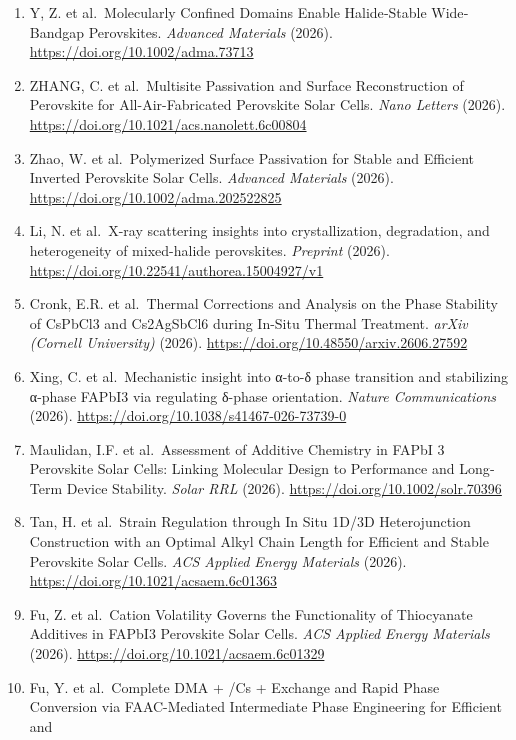 \documentclass[
  11pt,
]{article}
\begin{document}
\begin{enumerate}
  cells. \emph{Materials Futures} (2026).
  \url{https://doi.org/10.1088/2752-5724/ae7817}
\item
  Y, Z. et al.~Molecularly Confined Domains Enable Halide‐Stable
  Wide‐Bandgap Perovskites. \emph{Advanced Materials} (2026).
  \url{https://doi.org/10.1002/adma.73713}
\item
  ZHANG, C. et al.~Multisite Passivation and Surface Reconstruction of
  Perovskite for All-Air-Fabricated Perovskite Solar Cells. \emph{Nano
  Letters} (2026). \url{https://doi.org/10.1021/acs.nanolett.6c00804}
\item
  Zhao, W. et al.~Polymerized Surface Passivation for Stable and
  Efficient Inverted Perovskite Solar Cells. \emph{Advanced Materials}
  (2026). \url{https://doi.org/10.1002/adma.202522825}
\item
  Li, N. et al.~X-ray scattering insights into crystallization,
  degradation, and heterogeneity of mixed-halide perovskites.
  \emph{Preprint} (2026).
  \url{https://doi.org/10.22541/authorea.15004927/v1}
\item
  Cronk, E.R. et al.~Thermal Corrections and Analysis on the Phase
  Stability of CsPbCl3 and Cs2AgSbCl6 during In-Situ Thermal Treatment.
  \emph{arXiv (Cornell University)} (2026).
  \url{https://doi.org/10.48550/arxiv.2606.27592}
\item
  Xing, C. et al.~Mechanistic insight into α-to-δ phase transition and
  stabilizing α-phase FAPbI3 via regulating δ-phase orientation.
  \emph{Nature Communications} (2026).
  \url{https://doi.org/10.1038/s41467-026-73739-0}
\item
  Maulidan, I.F. et al.~Assessment of Additive Chemistry in FAPbI 3
  Perovskite Solar Cells: Linking Molecular Design to Performance and
  Long‐Term Device Stability. \emph{Solar RRL} (2026).
  \url{https://doi.org/10.1002/solr.70396}
\item
  Tan, H. et al.~Strain Regulation through In Situ 1D/3D Heterojunction
  Construction with an Optimal Alkyl Chain Length for Efficient and
  Stable Perovskite Solar Cells. \emph{ACS Applied Energy Materials}
  (2026). \url{https://doi.org/10.1021/acsaem.6c01363}
\item
  Fu, Z. et al.~Cation Volatility Governs the Functionality of
  Thiocyanate Additives in FAPbI3 Perovskite Solar Cells. \emph{ACS
  Applied Energy Materials} (2026).
  \url{https://doi.org/10.1021/acsaem.6c01329}
\item
  Fu, Y. et al.~Complete DMA + /Cs + Exchange and Rapid Phase Conversion
  via FAAC-Mediated Intermediate Phase Engineering for Efficient and

\end{enumerate}
\end{document}
